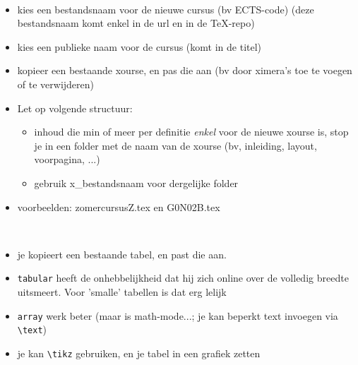 \documentclass{ximera}
\begin{document}
\begin{accordion}
\begin{accordion-item} \ 
	\begin{itemize}
		\item kies een bestandsnaam voor de nieuwe cursus (bv ECTS-code) (deze bestandsnaam komt enkel in de url en in de TeX-repo)
		\item kies een publieke naam voor de cursus (komt in de titel)
		\item kopieer een bestaande xourse, en pas die aan (bv door ximera's toe te voegen of te verwijderen)
		\item Let op volgende structuur:
		\begin{itemize}
			\item inhoud die min of meer per definitie \textit{enkel} voor de nieuwe xourse is, stop je in een folder met de naam van de xourse (bv, inleiding, layout, voorpagina, ...)
			\item gebruik x\_bestandsnaam voor dergelijke folder
		\end{itemize}
		\item voorbeelden: zomercursusZ.tex en G0N02B.tex
	\end{itemize}

\end{accordion-item}
\begin{accordion-item} \ 
	\begin{itemize}
		\item je kopieert een bestaande tabel, en past die aan.
		\item \verb|tabular| heeft de onhebbelijkheid dat hij zich online over de volledig breedte uitsmeert. Voor 'smalle' tabellen is dat erg lelijk
		\item \verb|array| werk beter (maar is math-mode...; je kan beperkt text invoegen via \verb|\text|)
		\item je kan \verb|\tikz| gebruiken, en je tabel in een grafiek zetten
	\end{itemize}
	
\end{accordion-item}
\end{accordion}	
\end{document}
